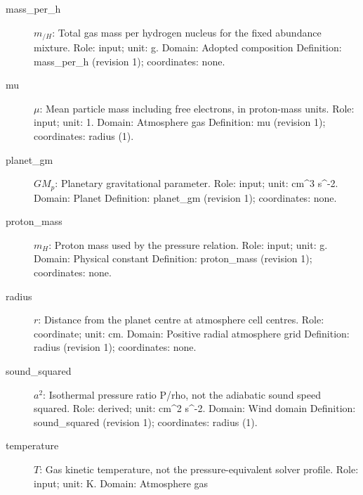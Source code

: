\begin{description}
\item[mass\_per\_h] $m_{/H}$: Total gas mass per hydrogen nucleus for the fixed abundance mixture.
\newline Role: input; unit: g.
\newline Domain: Adopted composition
\newline Definition: mass\_per\_h (revision 1); coordinates: none.
\item[mu] $\mu$: Mean particle mass including free electrons, in proton-mass units.
\newline Role: input; unit: 1.
\newline Domain: Atmosphere gas
\newline Definition: mu (revision 1); coordinates: radius (1).
\item[planet\_gm] $GM_p$: Planetary gravitational parameter.
\newline Role: input; unit: cm\textasciicircum{}3 s\textasciicircum{}-2.
\newline Domain: Planet
\newline Definition: planet\_gm (revision 1); coordinates: none.
\item[proton\_mass] $m_H$: Proton mass used by the pressure relation.
\newline Role: input; unit: g.
\newline Domain: Physical constant
\newline Definition: proton\_mass (revision 1); coordinates: none.
\item[radius] $r$: Distance from the planet centre at atmosphere cell centres.
\newline Role: coordinate; unit: cm.
\newline Domain: Positive radial atmosphere grid
\newline Definition: radius (revision 1); coordinates: none.
\item[sound\_squared] $a^2$: Isothermal pressure ratio P/rho, not the adiabatic sound speed squared.
\newline Role: derived; unit: cm\textasciicircum{}2 s\textasciicircum{}-2.
\newline Domain: Wind domain
\newline Definition: sound\_squared (revision 1); coordinates: radius (1).
\item[temperature] $T$: Gas kinetic temperature, not the pressure-equivalent solver profile.
\newline Role: input; unit: K.
\newline Domain: Atmosphere gas

\end{description}
